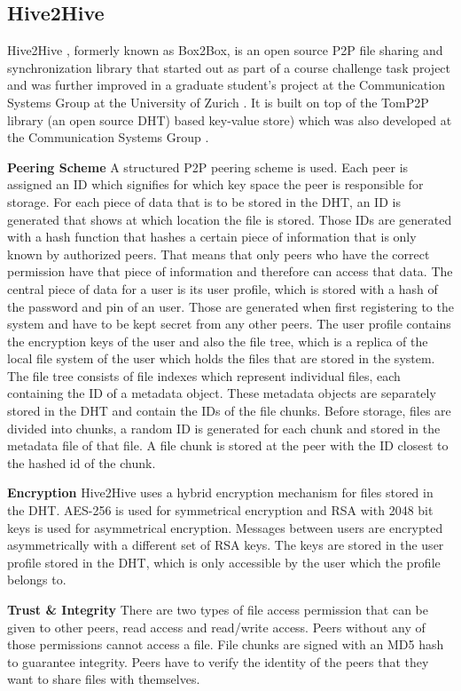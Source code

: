 \subsection{Hive2Hive}
Hive2Hive \cite{hive2hive}, formerly known as Box2Box, is an open source P2P file sharing and synchronization library that started out as part of a course challenge task project and was further improved in a graduate student's project at the Communication Systems Group at the University of Zurich \cite{hive2hive:about}. It is built on top of the TomP2P library (an open source DHT) based key-value store) which was also developed at the Communication Systems Group \cite{tomp2p}.

\textbf{Peering Scheme}
A structured P2P peering scheme is used. Each peer is assigned an ID which signifies for which key space the peer is responsible for storage. For each piece of data that is to be stored in the DHT, an ID is generated that shows at which location the file is stored. Those IDs are generated with a hash function that hashes a certain piece of information that is only known by authorized peers. That means that only peers who have the correct permission have that piece of information and therefore can access that data.
The central piece of data for a user is its user profile, which is stored with a hash of the password and pin of an user. Those are generated when first registering to the system and have to be kept secret from any other peers. The user profile contains the encryption keys of the user and also the file tree, which is a replica of the local file system of the user which holds the files that are stored in the system. The file tree consists of file indexes which represent individual files, each containing the ID of a metadata object. These metadata objects are separately stored in the DHT and contain the IDs of the file chunks. Before storage, files are divided into chunks, a random ID is generated for each chunk and stored in the metadata file of that file. A file chunk is stored at the peer with the ID closest to the hashed id of the chunk.

\textbf{Encryption}
Hive2Hive uses a hybrid encryption mechanism for files stored in the DHT. AES-256 is used for symmetrical encryption and RSA with 2048 bit keys is used for asymmetrical encryption. Messages between users are encrypted asymmetrically with a different set of RSA keys.
The keys are stored in the user profile stored in the DHT, which is only accessible by the user which the profile belongs to.

\textbf{Trust \& Integrity}
There are two types of file access permission that can be given to other peers, read access and read/write access. Peers without any of those permissions cannot access a file. File chunks are signed with an MD5 hash to guarantee integrity. Peers have to verify the identity of the peers that they want to share files with themselves.

